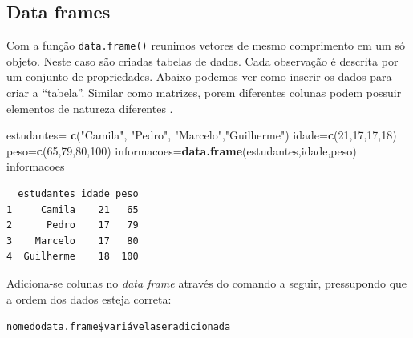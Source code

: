 \documentclass[12pt,brazil,oneside]{book}
\newenvironment{Shaded}{\begin{snugshade}}{\end{snugshade}}
\newcommand{\DecValTok}[1]{\textcolor[rgb]{0.00,0.00,0.81}{#1}}
\newcommand{\KeywordTok}[1]{\textcolor[rgb]{0.13,0.29,0.53}{\textbf{#1}}}
\newcommand{\NormalTok}[1]{#1}
\newcommand{\OperatorTok}[1]{\textcolor[rgb]{0.81,0.36,0.00}{\textbf{#1}}}
\newcommand{\StringTok}[1]{\textcolor[rgb]{0.31,0.60,0.02}{#1}}
\begin{document}
\hypertarget{data-frames}{%
\subsection{Data frames}\label{data-frames}}

Com a função \texttt{data.frame()} reunimos vetores de mesmo comprimento
em um só objeto. Neste caso são criadas tabelas de dados. Cada
observação é descrita por um conjunto de propriedades. Abaixo podemos
ver como inserir os dados para criar a ``tabela''. Similar como
matrizes, porem diferentes colunas podem possuir elementos de natureza
diferentes .

\begin{Shaded}
\begin{Highlighting}[]
\NormalTok{estudantes=}\StringTok{ }\KeywordTok{c}\NormalTok{(}\StringTok{"Camila"}\NormalTok{, }\StringTok{"Pedro"}\NormalTok{, }\StringTok{"Marcelo"}\NormalTok{,}\StringTok{"Guilherme"}\NormalTok{)}
\NormalTok{idade=}\KeywordTok{c}\NormalTok{(}\DecValTok{21}\NormalTok{,}\DecValTok{17}\NormalTok{,}\DecValTok{17}\NormalTok{,}\DecValTok{18}\NormalTok{)}
\NormalTok{peso=}\KeywordTok{c}\NormalTok{(}\DecValTok{65}\NormalTok{,}\DecValTok{79}\NormalTok{,}\DecValTok{80}\NormalTok{,}\DecValTok{100}\NormalTok{)}
\NormalTok{informacoes=}\KeywordTok{data.frame}\NormalTok{(estudantes,idade,peso)}
\NormalTok{informacoes}
\end{Highlighting}
\end{Shaded}

\begin{verbatim}
  estudantes idade peso
1     Camila    21   65
2      Pedro    17   79
3    Marcelo    17   80
4  Guilherme    18  100
\end{verbatim}

Adiciona-se colunas no \emph{data frame} através do comando a seguir,
pressupondo que a ordem dos dados esteja correta:

\texttt{nomedodata.frame\$variávelaseradicionada}

\begin{Shaded}
\end{Shaded}
\end{document}
